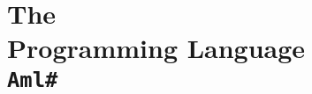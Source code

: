 
\part[The Amlantis\# Programming Language]{The \AmlSharpTitle \\Programming Language \\ \vspace{1cm} \lstinline!Aml#!}
\label{part:language-sharp}
















